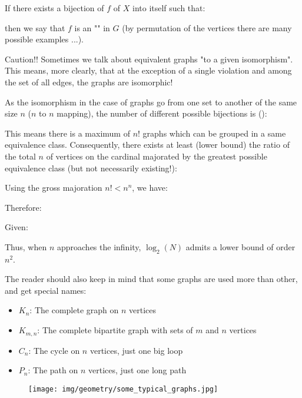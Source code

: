 {\begin{enumerate}
		If there exists a bijection of $f$ of $X$ into itself such that:
		
		then we say that $f$ is an "" in $G$ (by permutation of the vertices there are many possible examples ...).
		
		\begin{tcolorbox}[colback=red!5,borderline={1mm}{2mm}{red!5},arc=0mm,boxrule=0pt]
		\bcbombe Caution!! Sometimes we talk about equivalent graphs "to a given isomorphism". This means, more clearly, that at the exception of a single violation and among the set of all edges, the graphs are isomorphic!
		\end{tcolorbox}
		
		As the isomorphism in the case of graphs go from one set to another of the same size $n$ ($n$ to $n$ mapping), the number of different possible bijections is ():
		
		This means there is a maximum of $n!$ graphs which can be grouped in a same equivalence class. Consequently, there exists at least (lower bound) the ratio of the total $n$ of vertices on the cardinal majorated by the greatest possible equivalence class (but not necessarily existing!):
			
		Using the gross majoration $n!<n^n$, we have:
		
		Therefore:
		
		Given:
		
		Thus, when $n$ approaches the infinity, $\log_2(N)$ admits a lower bound of order $n^2$.
	\end{enumerate}
	The reader should also keep in mind that some graphs are used more than other, and get special names:
	\begin{itemize}
		\item $K_n$: The complete graph on $n$ vertices
		\item $K_{m,n}$: The complete bipartite graph with sets of $m$ and $n$ vertices
		\item $C_n$: The cycle on $n$ vertices, just one big loop
		\item $P_n$: The path on $n$ vertices, just one long path
	\end{itemize}
	\begin{figure}[H]
		\centering
		\texttt{[image: img/geometry/some\_typical\_graphs.jpg]}
	\end{figure}
	
}
